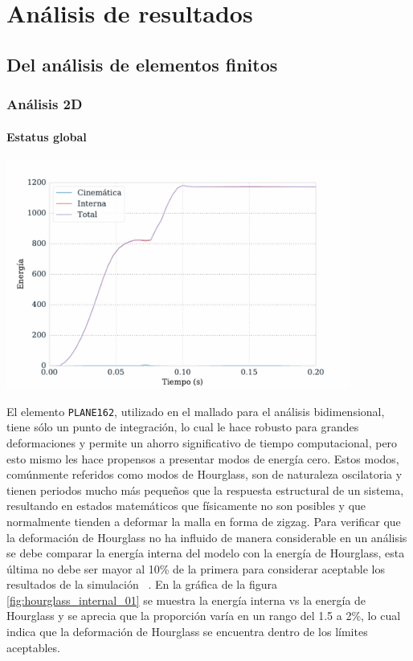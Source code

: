 \chapter{Análisis de resultados}

\section{Del análisis de elementos finitos}

\subsection{Análisis 2D}


\subsubsection{Estatus global}

\begin{center}
\includegraphics[width=0.85\textwidth]{src/ch4/energy_status_01.pdf}
\label{fig:energy_status_01}
\end{center}

El elemento \texttt{PLANE162}, utilizado en el mallado para el análisis bidimensional, 
tiene sólo un punto de integración, lo cual le hace robusto para grandes deformaciones 
y permite un ahorro significativo de tiempo computacional, pero esto mismo les hace 
propensos a presentar modos de energía cero. Estos modos, comúnmente referidos como 
modos de Hourglass, son de naturaleza oscilatoria y tienen periodos mucho más pequeños 
que la respuesta estructural de un sistema, resultando en estados matemáticos que físicamente 
no son posibles y que normalmente tienden a deformar la malla en forma de zigzag.
Para verificar que la deformación de Hourglass no ha influido de manera considerable 
en un análisis se debe comparar la energía interna del modelo con la energía de Hourglass, 
esta última no debe ser mayor al 10\% de la primera para considerar aceptable los 
resultados de la simulación ~\cite{lsdyna-ansys-manual}. En la gráfica de la figura \ref{fig:hourglass_internal_01} 
se muestra la energía interna vs la energía de Hourglass y se aprecia que la proporción 
varía en un rango del 1.5 a 2\%, lo cual indica que la deformación de Hourglass se encuentra 
dentro de los límites aceptables.

